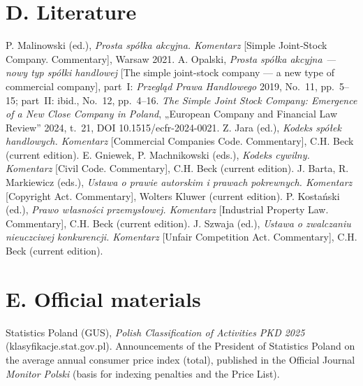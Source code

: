 \section*{D. Literature}
\begin{BibList}
 P. Malinowski (ed.), \emph{Prosta spółka akcyjna. Komentarz} [Simple Joint-Stock Company. Commentary], Warsaw 2021.
 A. Opalski, \emph{Prosta spółka akcyjna --- nowy typ spółki handlowej} [The simple joint-stock company --- a new type of commercial company], part~I: \emph{Przegląd Prawa Handlowego} 2019, No.~11, pp.~5--15; part~II: ibid., No.~12, pp.~4--16.
 \emph{The Simple Joint Stock Company: Emergence of a New Close Company in Poland}, „European Company and Financial Law Review” 2024, t.~21, DOI 10.1515/ecfr-2024-0021.
 Z. Jara (ed.), \emph{Kodeks spółek handlowych. Komentarz} [Commercial Companies Code. Commentary], C.H. Beck (current edition).
 E. Gniewek, P. Machnikowski (eds.), \emph{Kodeks cywilny. Komentarz} [Civil Code. Commentary], C.H. Beck (current edition).
 J. Barta, R. Markiewicz (eds.), \emph{Ustawa o prawie autorskim i prawach pokrewnych. Komentarz} [Copyright Act. Commentary], Wolters Kluwer (current edition).
 P. Kostański (ed.), \emph{Prawo własności przemysłowej. Komentarz} [Industrial Property Law. Commentary], C.H. Beck (current edition).
 J. Szwaja (ed.), \emph{Ustawa o zwalczaniu nieuczciwej konkurencji. Komentarz} [Unfair Competition Act. Commentary], C.H. Beck (current edition).
\end{BibList}

\section*{E. Official materials}
\begin{BibList}
 Statistics Poland (GUS), \emph{Polish Classification of Activities PKD 2025} (klasyfikacje.stat.gov.pl).
 Announcements of the President of Statistics Poland on the average annual consumer price index (total), published in the Official Journal \emph{Monitor Polski} (basis for indexing penalties and the Price List).
\end{BibList}

